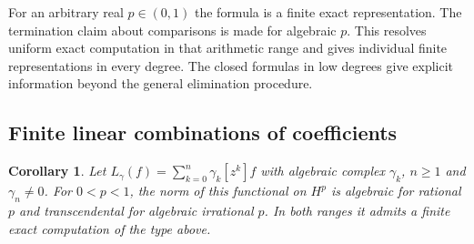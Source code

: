 \documentclass[11pt]{article}
\newtheorem{corollary}[theorem]{Corollary}
\begin{document}
For an arbitrary real \(p\in(0,1)\) the formula is a finite exact
representation. The termination claim about comparisons is made
for algebraic \(p\). This resolves uniform exact computation in that
arithmetic range and gives individual finite representations in
every degree. The closed formulas in low degrees give explicit
information beyond the general elimination procedure.

\subsection{Finite linear combinations of coefficients}

\begin{corollary}\label{cor:hardy-arithmetic-general}
Let \(L_\gamma(f)=\sum_{k=0}^n\gamma_k[z^k]f\) with algebraic
complex \(\gamma_k\), \(n\geq1\) and \(\gamma_n\ne0\).
For \(0<p<1\), the norm of this functional on \(H^p\) is
algebraic for rational \(p\) and transcendental for algebraic
irrational \(p\). In both ranges it admits a finite exact
computation of the type above.
\end{corollary}
\end{document}
